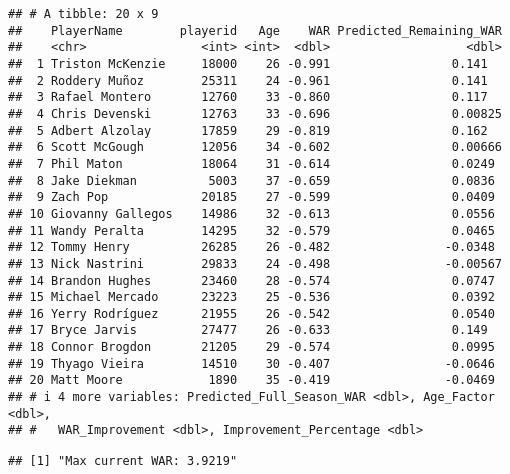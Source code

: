 \documentclass[
]{article}
\newenvironment{Shaded}{\begin{snugshade}}{\end{snugshade}}
\newcommand{\CommentTok}[1]{\textcolor[rgb]{0.56,0.35,0.01}{\textit{#1}}}
\newcommand{\FunctionTok}[1]{\textcolor[rgb]{0.13,0.29,0.53}{\textbf{#1}}}
\newcommand{\NormalTok}[1]{#1}
\newcommand{\SpecialCharTok}[1]{\textcolor[rgb]{0.81,0.36,0.00}{\textbf{#1}}}
\newcommand{\StringTok}[1]{\textcolor[rgb]{0.31,0.60,0.02}{#1}}
\begin{document}
\begin{verbatim}
## # A tibble: 20 x 9
##    PlayerName        playerid   Age    WAR Predicted_Remaining_WAR
##    <chr>                <int> <int>  <dbl>                   <dbl>
##  1 Triston McKenzie     18000    26 -0.991                 0.141  
##  2 Roddery Muñoz        25311    24 -0.961                 0.141  
##  3 Rafael Montero       12760    33 -0.860                 0.117  
##  4 Chris Devenski       12763    33 -0.696                 0.00825
##  5 Adbert Alzolay       17859    29 -0.819                 0.162  
##  6 Scott McGough        12056    34 -0.602                 0.00666
##  7 Phil Maton           18064    31 -0.614                 0.0249 
##  8 Jake Diekman          5003    37 -0.659                 0.0836 
##  9 Zach Pop             20185    27 -0.599                 0.0409 
## 10 Giovanny Gallegos    14986    32 -0.613                 0.0556 
## 11 Wandy Peralta        14295    32 -0.579                 0.0465 
## 12 Tommy Henry          26285    26 -0.482                -0.0348 
## 13 Nick Nastrini        29833    24 -0.498                -0.00567
## 14 Brandon Hughes       23460    28 -0.574                 0.0747 
## 15 Michael Mercado      23223    25 -0.536                 0.0392 
## 16 Yerry Rodríguez      21955    26 -0.542                 0.0540 
## 17 Bryce Jarvis         27477    26 -0.633                 0.149  
## 18 Connor Brogdon       21205    29 -0.574                 0.0995 
## 19 Thyago Vieira        14510    30 -0.407                -0.0646 
## 20 Matt Moore            1890    35 -0.419                -0.0469 
## # i 4 more variables: Predicted_Full_Season_WAR <dbl>, Age_Factor <dbl>,
## #   WAR_Improvement <dbl>, Improvement_Percentage <dbl>
\end{verbatim}

\begin{Shaded}
\end{Shaded}

\begin{verbatim}
## [1] "Max current WAR: 3.9219"
\end{verbatim}

\begin{Shaded}
\end{Shaded}
\end{document}
